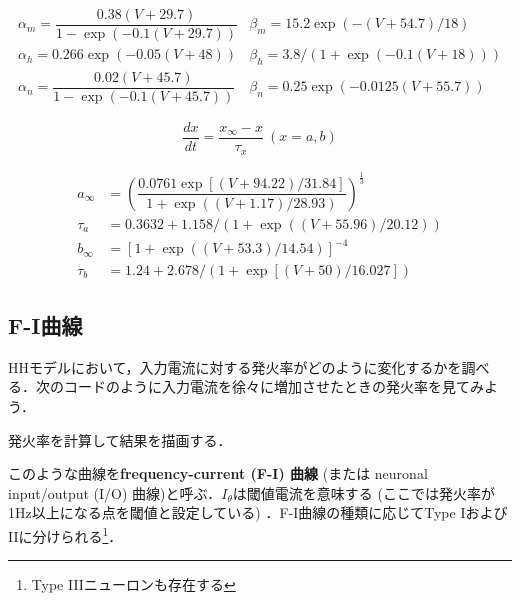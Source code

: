\begin{equation}
\begin{array}{ll}
\alpha_m=\dfrac{0.38(V+29.7)}{1-\exp (-0.1(V+29.7))} & \beta_m=15.2 \exp (-(V+54.7)/18) \\
\alpha_h=0.266 \exp (-0.05(V+48)) & \beta_h=3.8 /(1+\exp (-0.1(V+18))) \\ 
\alpha_n=\dfrac{0.02(V+45.7)}{1-\exp (-0.1(V+45.7))} & \beta_n=0.25 \exp (-0.0125(V+55.7))
\end{array}
\end{equation}



\begin{equation}
\frac{dx}{dt}=\frac{x_\infty-x}{\tau_x}\ (x=a, b)
    \end{equation}



\begin{align}
a_{\infty}&=\left(\dfrac{0.0761 \exp [(V+94.22)/31.84]}{1+\exp ((V+1.17)/28.93)}\right)^{\frac{1}{3}}\\
\tau_a&=0.3632+1.158 /(1+\exp ((V+55.96)/20.12)) \\
b_{\infty}&=\left[1+\exp ((V+53.3)/14.54)\right]^{-4}\\
\tau_b&=1.24+2.678 /(1+\exp [(V+50)/16.027])
\end{align}





\subsection{F-I曲線}
HHモデルにおいて，入力電流に対する発火率がどのように変化するかを調べる．次のコードのように入力電流を徐々に増加させたときの発火率を見てみよう．


発火率を計算して結果を描画する．


このような曲線を\textbf{frequency-current (F-I) 曲線} (または neuronal input/output (I/O) 曲線)と呼ぶ．$I_\theta$は閾値電流を意味する (ここでは発火率が1Hz以上になる点を閾値と設定している) ．F-I曲線の種類に応じてType IおよびIIに分けられる\footnote{Type IIIニューロンも存在する}．
